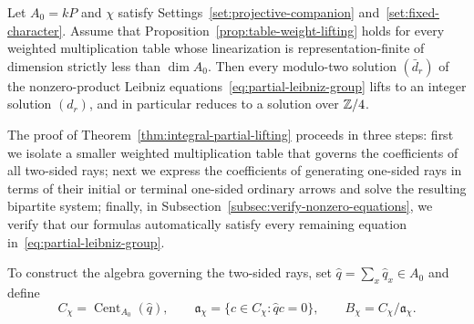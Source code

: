 \begin{theorem}
\label{thm:integral-partial-lifting}
Let $A_0=kP$ and $\chi$ satisfy Settings~\ref{set:projective-companion} and~\ref{set:fixed-character}. Assume that Proposition~\ref{prop:table-weight-lifting} holds for every weighted multiplication table whose linearization is representation-finite of dimension strictly less than $\dim A_0$. Then every modulo-two solution $(\bar d_r)$ of the nonzero-product Leibniz equations~\eqref{eq:partial-leibniz-group} lifts to an integer solution $(d_r)$, and in particular reduces to a solution over $\mathbb Z/4$.
\end{theorem}

The proof of Theorem~\ref{thm:integral-partial-lifting} proceeds in three steps: first we isolate a smaller weighted multiplication table that governs the coefficients of all two-sided rays; next we express the coefficients of generating one-sided rays in terms of their initial or terminal one-sided ordinary arrows and solve the resulting bipartite system; finally, in Subsection~\ref{subsec:verify-nonzero-equations}, we verify that our formulas automatically satisfy every remaining equation in~\eqref{eq:partial-leibniz-group}.

To construct the algebra governing the two-sided rays, set $\widehat q=\sum_x\widehat q_x\in A_0$ and define
\[
  C_\chi=\operatorname{Cent}_{A_0}(\widehat q),\qquad
  \mathfrak a_\chi=\{c\in C_\chi:\widehat q c=0\},\qquad
  B_\chi=C_\chi/\mathfrak a_\chi.
\]

